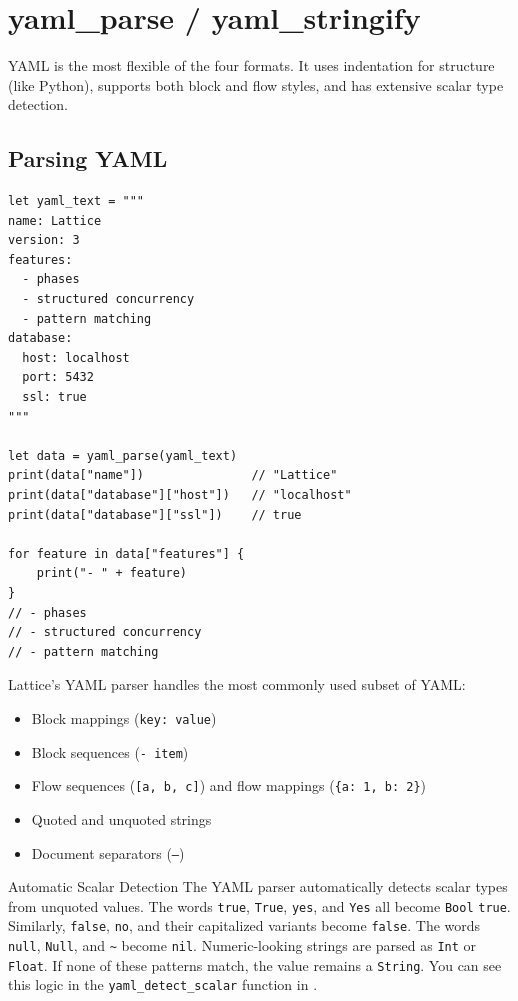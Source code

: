 \section{yaml\_parse / yaml\_stringify}\label{sec:yaml}


YAML is the most flexible of the four formats. It uses indentation for
structure (like Python), supports both block and flow styles, and has
extensive scalar type detection.

\subsection{Parsing YAML}

\begin{lstlisting}[language=Lattice, caption={Parsing a YAML document}]
let yaml_text = """
name: Lattice
version: 3
features:
  - phases
  - structured concurrency
  - pattern matching
database:
  host: localhost
  port: 5432
  ssl: true
"""

let data = yaml_parse(yaml_text)
print(data["name"])               // "Lattice"
print(data["database"]["host"])   // "localhost"
print(data["database"]["ssl"])    // true

for feature in data["features"] {
    print("- " + feature)
}
// - phases
// - structured concurrency
// - pattern matching
\end{lstlisting}

Lattice's YAML parser handles the most commonly used subset of YAML:

\begin{itemize}
    \item Block mappings (\texttt{key: value})
    \item Block sequences (\texttt{- item})
    \item Flow sequences (\texttt{[a, b, c]}) and flow mappings
          (\texttt{\{a: 1, b: 2\}})
    \item Quoted and unquoted strings
    \item Document separators (\texttt{---})
\end{itemize}

\begin{notebox}{Automatic Scalar Detection}
The YAML parser automatically detects scalar types from unquoted values.
The words \texttt{true}, \texttt{True}, \texttt{yes}, and \texttt{Yes} all
become \lstinline|Bool| \lstinline|true|. Similarly, \texttt{false},
\texttt{no}, and their capitalized variants become \lstinline|false|. The
words \texttt{null}, \texttt{Null}, and \texttt{\textasciitilde} become
\lstinline|nil|. Numeric-looking strings are parsed as \lstinline|Int| or
\lstinline|Float|. If none of these patterns match, the value remains a
\lstinline|String|. You can see this logic in the
\texttt{yaml\_detect\_scalar} function in .
\end{notebox}

